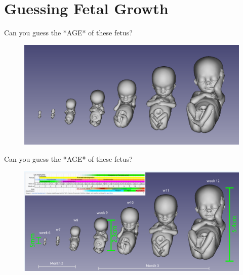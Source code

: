 \section{Guessing Fetal Growth}


{
\begin{frame}{Can you guess the *AGE* of these fetus?}
      \begin{figure}
        \centering
        \includegraphics[width=1.0\textwidth]{./figures/fetal-ages/versions/drawing-v00.png}
      \end{figure}
\end{frame}
}

{
\begin{frame}{Can you guess the *AGE* of these fetus?}
      \begin{figure}
        \centering
        \includegraphics[width=1.0\textwidth]{./figures/fetal-ages/versions/drawing-v01.png}
      \end{figure}
\end{frame}
}

